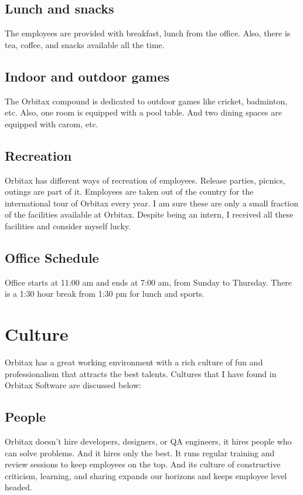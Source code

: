\begin{flushleft}
\subsection{ Lunch and snacks}
The employees are provided with breakfast, lunch from the office. Also, there is tea, coffee, and snacks available all the time.


\subsection{Indoor and outdoor games}
The Orbitax compound is dedicated to outdoor games like cricket, badminton, etc. Also, one room is equipped with a pool table. And two dining spaces are equipped with carom, etc.



\subsection{Recreation}
Orbitax has different ways of recreation of employees. Release parties, picnics, outings are part of it. Employees are taken out of the country for the international tour of Orbitax every year. I am sure these are only a small fraction of the facilities available at Orbitax. Despite being an intern, I received all these facilities and consider myself lucky.


\subsection{Office Schedule}
Office starts at 11:00 am and ends at 7:00 am, from Sunday to Thursday. There is a 1:30 hour break from 1:30 pm for lunch and sports.




\section{Culture}
Orbitax has a great working environment with a rich culture of fun and professionalism that attracts the best talents. Cultures that I have found in Orbitax Software are discussed below:

\subsection{People}
Orbitax doesn’t hire developers, designers, or QA engineers, it hires people who can solve problems. And it hires only the best. It runs regular training and review sessions to keep employees on the top. And its culture of constructive criticism, learning, and sharing expands our horizons and keeps employee level headed.



\end{flushleft}
